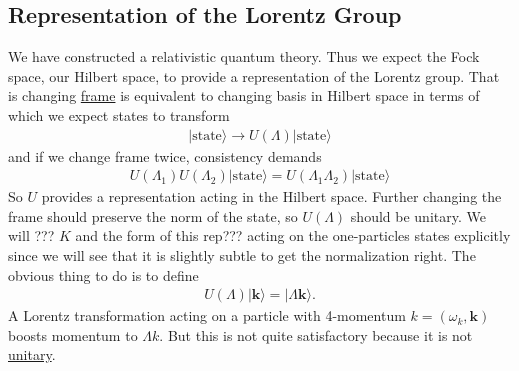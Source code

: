 \documentclass{article}
\begin{document}
\subsection{Representation of the Lorentz Group}

We have constructed a relativistic quantum theory. Thus we expect the Fock space, our Hilbert space, to provide a representation of the Lorentz group. That is changing \underline{frame} is equivalent to changing basis in Hilbert space in terms of which we expect states to transform
\begin{align}
|\text{state}\rangle \rightarrow U(\Lambda)|\text{state}\rangle
\end{align}
and if we change frame twice, consistency demands
\begin{align}
U(\Lambda_1)U(\Lambda_2)|\text{state}\rangle=U(\Lambda_1 \Lambda_2)|\text{state}\rangle
\end{align}
So $U$ provides a representation acting in the Hilbert space. Further changing the frame should preserve the norm of the state, so $U(\Lambda)$ should be unitary. We will ??? $K$ and the form of this rep??? acting on the one-particles states explicitly since we will see that it is slightly subtle to get the normalization right.
The obvious thing to do is to define
\begin{align}
U(\Lambda)|\mathbf{k}\rangle=|\Lambda\mathbf{k}\rangle.
\end{align}
A Lorentz transformation acting on a particle with 4-momentum 
$k=(\omega_k,\mathbf{k})$ boosts momentum to $\Lambda k$. But this is not quite satisfactory because it is not \underline{unitary}.
\end{document}

